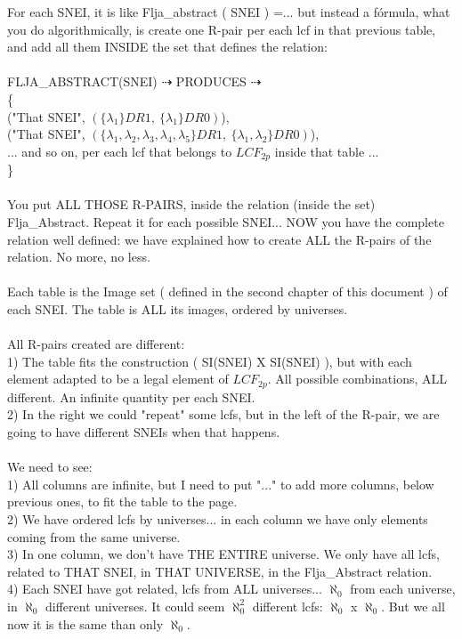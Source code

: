	\noindent
	For each SNEI, it is like Flja\_abstract ( SNEI ) =... but instead a fórmula, what you do algorithmically, is create one R-pair per each lcf in that previous table, and add all them INSIDE the set that defines the relation:\\\\
	FLJA\_ABSTRACT(SNEI) $\dashrightarrow$ PRODUCES  $\dashrightarrow$\\
	\{\\
		\indent ("That SNEI", $(\{\lambda_{1}\}DR1,\:\{\lambda_{1}\}DR0)$), \\
		\indent ("That SNEI", $(\{\lambda_{1}, \lambda_{2}, \lambda_{3}, \lambda_{4}, \lambda_{5}\}DR1,\:\{\lambda_{1}, \lambda_{2}\}DR0)$),\\
		\indent ... and so on, per each lcf that belongs to $LCF_{2p}$ inside that table ...\\	
	\}	
	\\\\
	
	\noindent
	You put ALL THOSE R-PAIRS, inside the relation (inside the set) Flja\_Abstract. Repeat it for each possible SNEI... NOW you have the complete relation well defined: we have explained how to create ALL the R-pairs of the relation. No more, no less.
	\\\\
	
	\noindent
	Each table is the Image set ( defined in the second chapter of this document ) of each SNEI. The table is ALL its images, ordered by universes.
	\\\\
	
	\noindent
	All R-pairs created are different:\\
	1) The table fits the construction ( SI(SNEI) X SI(SNEI) ), but with each element adapted to be a legal element of $LCF_{2p}$. All possible combinations, ALL different. An infinite quantity per each SNEI.\\
	2) In the right we could "repeat" some lcfs, but in the left of the R-pair, we are going to have different SNEIs when that happens.
	\\\\
	
	\noindent
	We need to see:\\
	1) All columns are infinite, but I need to put "..." to add more columns, below previous ones, to fit the table to the page.\\
	2) We have ordered lcfs by universes... in each column we have only elements coming from the same universe.\\
	3) In one column, we don't have THE ENTIRE universe. We only have all lcfs, related to THAT SNEI, in THAT UNIVERSE, in the Flja\_Abstract relation.\\
	4) Each SNEI have got related, lcfs from ALL universes... $\aleph_{0}$ from each universe, in $\aleph_{0}$ different universes. It could seem $\aleph_{0}^{2}$ different lcfs: $\aleph_{0}$ x $\aleph_{0}$. But we all now it is the same than only $\aleph_{0}$. 
	\\\\
	
